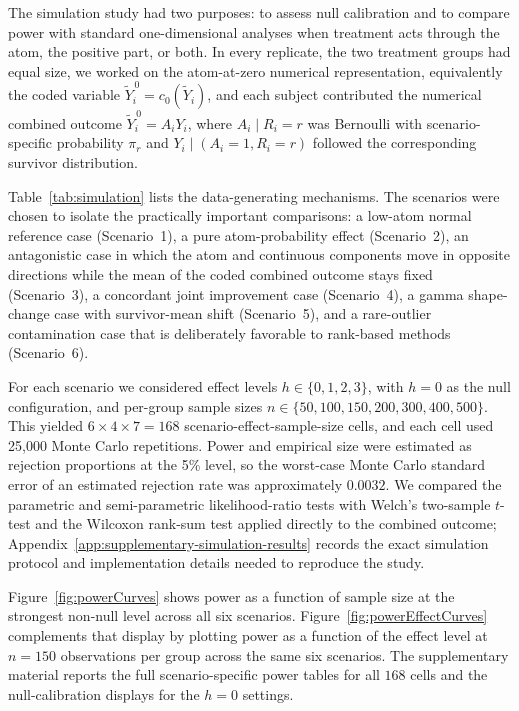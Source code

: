 \documentclass[11pt]{article}
\begin{document}
The simulation study had two purposes: to assess null calibration and to compare power with standard one-dimensional analyses when treatment acts through the atom, the positive part, or both. In every replicate, the two treatment groups had equal size, we worked on the atom-at-zero numerical representation, equivalently the coded variable $\widetilde{Y}_i^{\,0} = c_0(\widetilde{Y}_i)$, and each subject contributed the numerical combined outcome $\widetilde{Y}_i^{\,0} = A_iY_i$, where $A_i \mid R_i = r$ was Bernoulli with scenario-specific probability $\pi_r$ and $Y_i \mid (A_i = 1, R_i = r)$ followed the corresponding survivor distribution.

Table~\ref{tab:simulation} lists the data-generating mechanisms. The scenarios were chosen to isolate the practically important comparisons: a low-atom normal reference case (Scenario~1), a pure atom-probability effect (Scenario~2), an antagonistic case in which the atom and continuous components move in opposite directions while the mean of the coded combined outcome stays fixed (Scenario~3), a concordant joint improvement case (Scenario~4), a gamma shape-change case with survivor-mean shift (Scenario~5), and a rare-outlier contamination case that is deliberately favorable to rank-based methods (Scenario~6).



For each scenario we considered effect levels $h \in \{0, 1, 2, 3\}$, with $h = 0$ as the null configuration, and per-group sample sizes $n \in \{50,100,150,200,300,400,500\}$. This yielded $6 \times 4 \times 7 = 168$ scenario-effect-sample-size cells, and each cell used 25,000 Monte Carlo repetitions. Power and empirical size were estimated as rejection proportions at the 5\% level, so the worst-case Monte Carlo standard error of an estimated rejection rate was approximately $0.0032$. We compared the parametric and semi-parametric likelihood-ratio tests with Welch's two-sample $t$-test and the Wilcoxon rank-sum test applied directly to the combined outcome; Appendix~\ref{app:supplementary-simulation-results} records the exact simulation protocol and implementation details needed to reproduce the study.

Figure~\ref{fig:powerCurves} shows power as a function of sample size at the strongest non-null level across all six scenarios. Figure~\ref{fig:powerEffectCurves} complements that display by plotting power as a function of the effect level at $n = 150$ observations per group across the same six scenarios. The supplementary material reports the full scenario-specific power tables for all $168$ cells and the null-calibration displays for the $h = 0$ settings.
\end{document}

